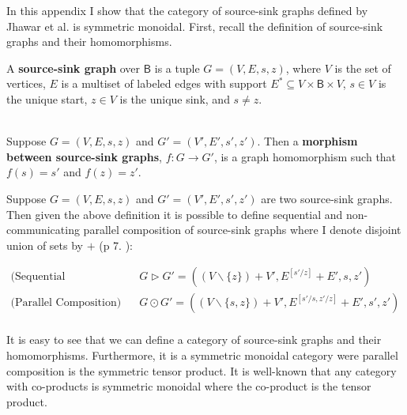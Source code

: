 In this appendix I show that the category of source-sink graphs
defined by Jhawar et al. \cite{Jhawar:2015} is symmetric monoidal.
First, recall the definition of source-sink graphs and their
homomorphisms.
\begin{definition}
  \label{def:source-sink-graphs}
  A \textbf{source-sink graph} over $\mathsf{B}$ is a tuple $G = (V ,
  E, s, z)$, where $V$ is the set of vertices, $E$ is a multiset of
  labeled edges with support $E^* \subseteq V \times \mathsf{B} \times
  V$, $s \in V$ is the unique start, $z \in V$ is the unique sink, and
  $s \neq z$.

  \ \\
  \noindent
  Suppose $G = (V , E, s, z)$ and $G' = (V' , E', s', z')$.  Then a
  \textbf{morphism between source-sink graphs}, $f : G \to G'$, is a
  graph homomorphism such that $f(s) = s'$ and $f(z) = z'$.
\end{definition}

Suppose $G = (V , E, s, z)$ and $G' = (V' , E', s', z')$ are two
source-sink graphs. Then given the above definition it is possible to
define sequential and non-communicating parallel composition of
source-sink graphs where I denote disjoint union of sets by $+$ (p
7. \cite{Jhawar:2015}):
\begin{center}
  \begin{math}
    \begin{array}{rll}
      \text{(Sequential Composition)} & G \rhd G'
      = ((V \mathop{\backslash} \{z \}) + V', E^{[s'/z]} + E', s , z')\\
      \text{(Parallel Composition)}   & G \odot G'
      = ((V \mathop{\backslash} \{s,z\}) + V', E^{[s'/s,z'/z]} + E', s' , z')\\
    \end{array}
  \end{math}
\end{center}

It is easy to see that we can define a category of source-sink graphs
and their homomorphisms.  Furthermore, it is a symmetric monoidal
category were parallel composition is the symmetric tensor product.
It is well-known that any category with co-products is symmetric
monoidal where the co-product is the tensor product.

